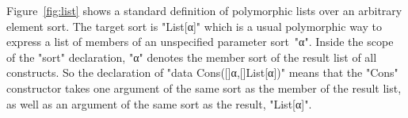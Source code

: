 \documentclass[letterpaper,11pt]{article}
\begin{document}
\begin{example}[lists]\label{ex:list}
  Figure~\ref{fig:list} shows a standard definition of polymorphic lists over an arbitrary element
  sort.  The target sort is "List[α]" which is a usual polymorphic way to express a list of members
  of an unspecified parameter sort~"α".  Inside the scope of the "sort" declaration, "α" denotes the
  member sort of the result list of all constructs. So the declaration of "data Cons([]α,[]List[α])"
  means that the "Cons" constructor takes one argument of the same sort as the member of the result
  list, as well as an argument of the same sort as the result, "List[α]".

\end{example}

\end{document}
